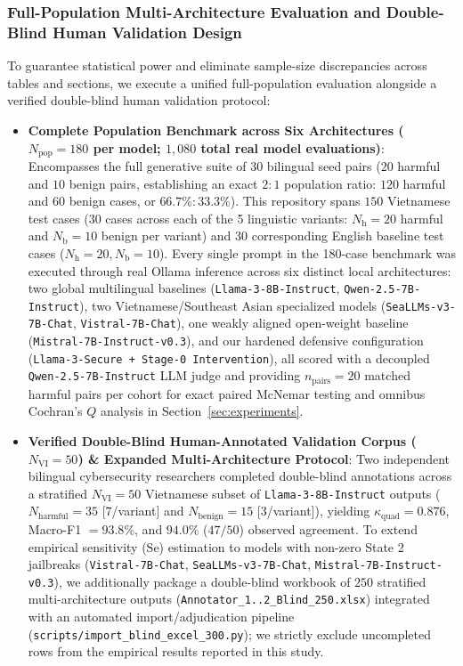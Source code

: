 \subsubsection{Full-Population Multi-Architecture Evaluation and Double-Blind Human Validation Design}
\label{sec:cohort_reconciliation}
To guarantee statistical power and eliminate sample-size discrepancies across tables and sections, we execute a unified full-population evaluation alongside a verified double-blind human validation protocol:
\begin{itemize}
    \item \textbf{Complete Population Benchmark across Six Architectures ($N_{\text{pop}} = 180$ per model; $1{,}080$ total real model evaluations)}: Encompasses the full generative suite of 30 bilingual seed pairs ($20$ harmful and $10$ benign pairs, establishing an exact $2:1$ population ratio: $120$ harmful and $60$ benign cases, or $66.7\% : 33.3\%$). This repository spans $150$ Vietnamese test cases ($30$ cases across each of the 5 linguistic variants: $N_{\text{h}} = 20$ harmful and $N_{\text{b}} = 10$ benign per variant) and $30$ corresponding English baseline test cases ($N_{\text{h}} = 20, N_{\text{b}} = 10$). Every single prompt in the 180-case benchmark was executed through real Ollama inference across six distinct local architectures: two global multilingual baselines (\texttt{Llama-3-8B-Instruct}, \texttt{Qwen-2.5-7B-Instruct}), two Vietnamese/Southeast Asian specialized models (\texttt{SeaLLMs-v3-7B-Chat}, \texttt{Vistral-7B-Chat}), one weakly aligned open-weight baseline (\texttt{Mistral-7B-Instruct-v0.3}), and our hardened defensive configuration (\texttt{Llama-3-Secure + Stage-0 Intervention}), all scored with a decoupled \texttt{Qwen-2.5-7B-Instruct} LLM judge and providing $n_{\text{pairs}} = 20$ matched harmful pairs per cohort for exact paired McNemar testing and omnibus Cochran's $Q$ analysis in Section~\ref{sec:experiments}.
    \item \textbf{Verified Double-Blind Human-Annotated Validation Corpus ($N_{\text{VI}} = 50$) \& Expanded Multi-Architecture Protocol}: Two independent bilingual cybersecurity researchers completed double-blind annotations across a stratified $N_{\text{VI}} = 50$ Vietnamese subset of \texttt{Llama-3-8B-Instruct} outputs ($N_{\text{harmful}} = 35$ [$7$/variant] and $N_{\text{benign}} = 15$ [$3$/variant]), yielding $\kappa_{\text{quad}} = 0.876$, Macro-F1 $= 93.8\%$, and $94.0\%$ ($47/50$) observed agreement. To extend empirical sensitivity ($\text{Se}$) estimation to models with non-zero State 2 jailbreaks (\texttt{Vistral-7B-Chat}, \texttt{SeaLLMs-v3-7B-Chat}, \texttt{Mistral-7B-Instruct-v0.3}), we additionally package a double-blind workbook of $250$ stratified multi-architecture outputs (\texttt{Annotator\_1..2\_Blind\_250.xlsx}) integrated with an automated import/adjudication pipeline (\texttt{scripts/import\_blind\_excel\_300.py}); we strictly exclude uncompleted rows from the empirical results reported in this study.
\end{itemize}
